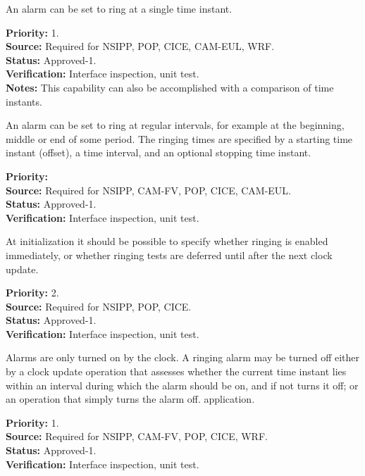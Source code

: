 
An alarm can be set to ring at a single time instant.
\begin{reqlist}
{\bf Priority:} 1. \\
{\bf Source:} Required for NSIPP, POP, CICE, CAM-EUL, WRF. \\
{\bf Status:} Approved-1. \\
{\bf Verification:} Interface inspection, unit test. \\
{\bf Notes:} This capability can also be accomplished with a comparison 
of time instants. 
\end{reqlist}

An alarm can be set to ring at regular intervals, for example
at the beginning, middle or end of some period.  The ringing times are 
specified by a starting time instant (offset), a time interval, and an optional 
stopping time instant.
\begin{reqlist}
{\bf Priority:} \\
{\bf Source:} Required for NSIPP, CAM-FV, POP, CICE, CAM-EUL. \\
{\bf Status:} Approved-1. \\
{\bf Verification:} Interface inspection, unit test.  
\end{reqlist}

At initialization it should be possible to
specify whether ringing is enabled immediately, or whether
ringing tests are deferred until after the next clock update.
\begin{reqlist}
{\bf Priority:} 2. \\
{\bf Source:} Required for NSIPP, POP, CICE. \\
{\bf Status:} Approved-1. \\
{\bf Verification:} Interface inspection, unit test.  
\end{reqlist}

Alarms are only turned on by the clock.  A ringing alarm may be turned off 
either by a clock update operation that assesses whether the current time instant
lies within an interval during which the alarm should be on, and if not turns it off; 
or an operation that simply turns the alarm off. 
application.
\begin{reqlist}
{\bf Priority:} 1. \\
{\bf Source:} Required for NSIPP, CAM-FV, POP, CICE, WRF. \\
{\bf Status:} Approved-1. \\
{\bf Verification:} Interface inspection, unit test.  
\end{reqlist}

